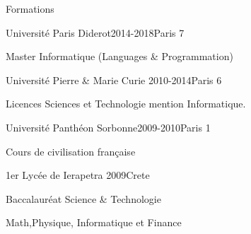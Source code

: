 \documentclass{resume} %
\begin{document}

\begin{rSection}{Formations}
	
\begin{rSubsection}{ Université Paris Diderot}{2014-2018}{}{Paris 7}
	\item Master Informatique (Languages \& Programmation)
\end{rSubsection}
\begin{rSubsection}{ Université Pierre \& Marie Curie }{2010-2014}{}{Paris 6}
	\item Licences Sciences et Technologie mention Informatique.
\end{rSubsection}
\begin{rSubsection}{ Université Panthéon Sorbonne}{2009-2010}{}{Paris 1}
	\item Cours de civilisation française
\end{rSubsection}

\begin{rSubsection}{ 1er Lycée de Ierapetra }{2009}{}{Crete}
	\item Baccalauréat Science \& Technologie
	\item Math,Physique, Informatique et Finance
\end{rSubsection}

\end{rSection}

\end{document}
